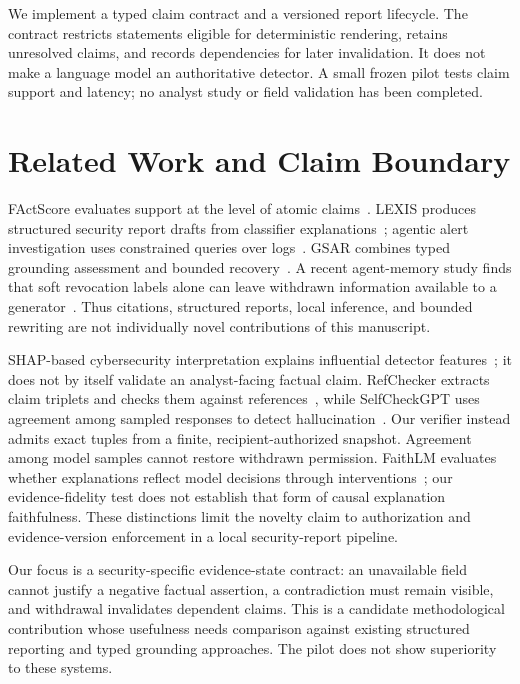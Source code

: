 We implement a typed claim contract and a versioned report lifecycle. The contract restricts statements eligible for deterministic rendering, retains unresolved claims, and records dependencies for later invalidation. It does not make a language model an authoritative detector. A small frozen pilot tests claim support and latency; no analyst study or field validation has been completed.

\section{Related Work and Claim Boundary}
FActScore evaluates support at the level of atomic claims~\cite{factscore}. LEXIS produces structured security report drafts from classifier explanations~\cite{lexis}; agentic alert investigation uses constrained queries over logs~\cite{investigation}. GSAR combines typed grounding assessment and bounded recovery~\cite{gsar}. A recent agent-memory study finds that soft revocation labels alone can leave withdrawn information available to a generator~\cite{revocation}. Thus citations, structured reports, local inference, and bounded rewriting are not individually novel contributions of this manuscript.

SHAP-based cybersecurity interpretation explains influential detector features~\cite{securityshap}; it does not by itself validate an analyst-facing factual claim. RefChecker extracts claim triplets and checks them against references~\cite{refchecker}, while SelfCheckGPT uses agreement among sampled responses to detect hallucination~\cite{selfcheck}. Our verifier instead admits exact tuples from a finite, recipient-authorized snapshot. Agreement among model samples cannot restore withdrawn permission. FaithLM evaluates whether explanations reflect model decisions through interventions~\cite{faithlm}; our evidence-fidelity test does not establish that form of causal explanation faithfulness. These distinctions limit the novelty claim to authorization and evidence-version enforcement in a local security-report pipeline.

Our focus is a security-specific evidence-state contract: an unavailable field cannot justify a negative factual assertion, a contradiction must remain visible, and withdrawal invalidates dependent claims. This is a candidate methodological contribution whose usefulness needs comparison against existing structured reporting and typed grounding approaches. The pilot does not show superiority to these systems.

